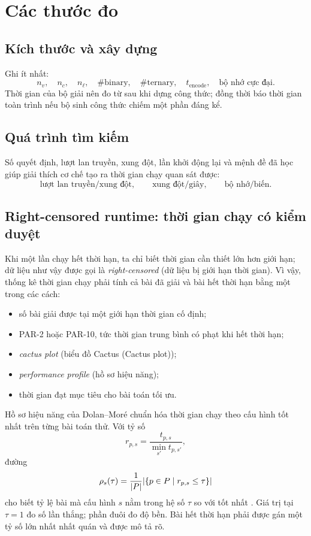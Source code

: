 \section{Các thước đo}

\subsection{Kích thước và xây dựng}

Ghi ít nhất:
\[
  n_v,\quad n_c,\quad n_\ell,\quad
  \#\text{binary},\quad
  \#\text{ternary},\quad
  t_{\text{encode}},\quad
  \text{bộ nhớ cực đại}.
\]
Thời gian của bộ giải nên đo từ sau khi dựng công thức; đồng thời báo thời gian
toàn trình nếu bộ sinh công thức chiếm một phần đáng kể.

\subsection{Quá trình tìm kiếm}

Số quyết định, lượt lan truyền, xung đột, lần khởi động lại và mệnh đề đã học
giúp giải thích cơ chế tạo ra thời gian chạy quan sát được:
\[
  \text{lượt lan truyền/xung đột},\qquad
  \text{xung đột/giây},\qquad
  \text{bộ nhớ/biến}.
\]

\subsection{Right-censored runtime: thời gian chạy có kiểm duyệt}

Khi một lần chạy hết thời hạn, ta chỉ biết thời gian cần thiết lớn hơn giới hạn;
dữ liệu như vậy được gọi là \emph{right-censored} (dữ liệu bị giới hạn thời gian).
Vì vậy, thống kê thời gian chạy phải tính cả bài đã giải và bài hết thời hạn
bằng một trong các cách:
\begin{itemize}
  \item số bài giải được tại một giới hạn thời gian cố định;
  \item PAR-2 hoặc PAR-10, tức thời gian trung bình có phạt khi hết thời hạn;
  \item \emph{cactus plot} (biểu đồ Cactus (Cactus plot));
  \item \emph{performance profile} (hồ sơ hiệu năng);
  \item thời gian đạt mục tiêu cho bài toán tối ưu.
\end{itemize}

Hồ sơ hiệu năng của Dolan--Moré chuẩn hóa thời gian chạy theo cấu hình tốt nhất
trên từng bài toán thử. Với tỷ số
\[
  r_{p,s}=
  \frac{t_{p,s}}{\min_{s'}t_{p,s'}},
\]
đường
\[
  \rho_s(\tau)=
  \frac{1}{|P|}
  \lvert \left\{p\in P\mid r_{p,s}\le\tau\right\}\rvert
\]
cho biết tỷ lệ bài mà cấu hình \(s\) nằm trong hệ số \(\tau\) so với tốt nhất
\parencite{dolan2002profiles}. Giá trị tại \(\tau=1\) đo số lần thắng; phần
đuôi đo độ bền. Bài hết thời hạn phải được gán một tỷ số lớn nhất nhất quán và
được mô tả rõ.

